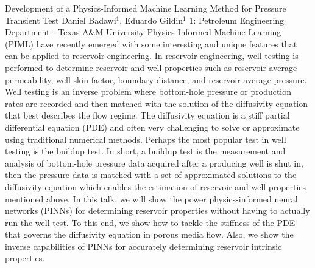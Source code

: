 \begin{addmargin}[2em]{0em}
\vspace{1.5ex}
\abs
{Development of a Physics-Informed Machine Learning Method for Pressure Transient Test}
{Daniel Badawi$^1$, Eduardo Gildin$^1$}
{1: Petroleum Engineering Department - Texas A\&M University}
{Physics-Informed Machine Learning (PIML) have recently emerged with some interesting and unique features that can be applied to reservoir engineering. In reservoir engineering, well testing  is performed to determine reservoir and well properties such as reservoir average permeability, well skin factor, boundary distance, and reservoir average pressure. Well testing is an inverse problem where bottom-hole pressure or production rates are recorded and then matched with the solution of the diffusivity equation that best describes the flow regime. The diffusivity equation is a stiff partial differential equation (PDE) and often very challenging to solve or approximate using traditional numerical methods. Perhaps the most popular test in well testing is the buildup test. In short, a buildup test is the measurement and analysis of bottom-hole pressure data acquired after a producing well is shut in, then the pressure data is matched with a set of approximated solutions to the diffusivity equation which enables the estimation of reservoir and well properties mentioned above. In this talk, we will show the power physics-informed neural networks (PINNs) for determining reservoir properties without having to actually run the well test. To this end, we  show how to tackle the stiffness of the PDE that governs the diffusivity equation in porous media flow. Also, we show the inverse capabilities of PINNs for accurately determining reservoir intrinsic properties.}



\end{addmargin}

